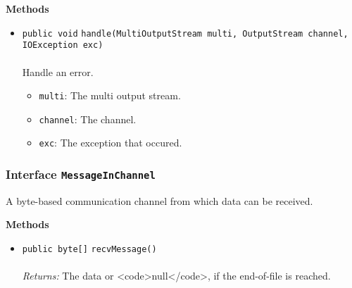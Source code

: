 \textbf{\sffamily Methods}
\begin{itemize}
\item \lstinline|public void| \lstinline|handle|\lstinline|(MultiOutputStream multi, OutputStream channel, IOException exc)|\\ \\[-0.6em]
Handle an error.
\begin{itemize}
\item \lstinline|multi|: The multi output stream.
\item \lstinline|channel|: The channel.
\item \lstinline|exc|: The exception that occured.
\end{itemize}



\end{itemize}

\subsubsection{Interface \lstinline|MessageInChannel|}
A byte-based communication channel from which data can be received. \\
\noindent\begin{minipage}[t]{5cm}
\vspace{0.3em}
\hspace*{2em}
\vspace{0.3em}
\end{minipage}





\textbf{\sffamily Methods}
\begin{itemize}
\item \lstinline|public byte[]| \lstinline|recvMessage|\lstinline|()|\\ \\[-0.6em]
\emph{Returns:} The data or <code>null</code>, if the end-of-file is reached.



\end{itemize}

